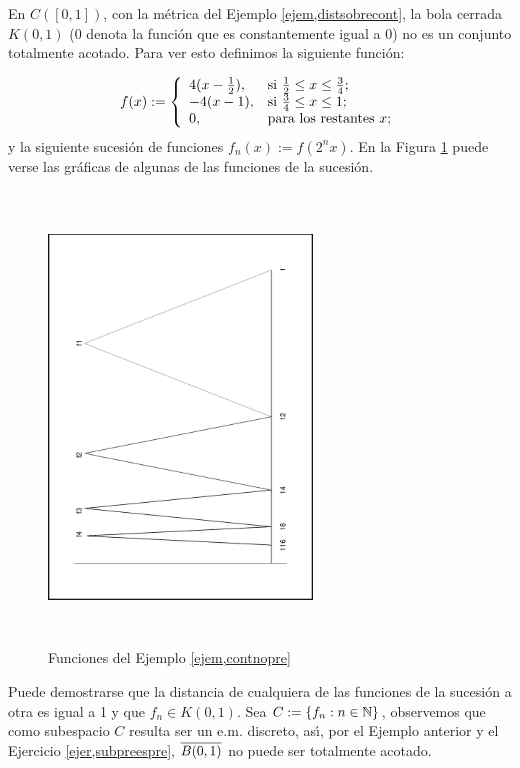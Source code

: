 \begin{ejemplo}\label{ejem,contnopre} En $C([0,1])$, con la m\'etrica
 del Ejemplo
\vref{ejem,distsobrecont}, la bola cerrada $K(0,1)$ (0 denota la
funci\'on que es constantemente igual a 0) no es un conjunto
totalmente acotado. Para ver esto definimos la siguiente
funci\'on:

\[
	f(x):=\left\{%
\begin{array}{ll}
	4(x-\frac12), & \hbox{si $\frac12\leq x\leq \frac34$;} \\
	-4(x-1), & \hbox{si $\frac34\leq x\leq 1$;} \\
	0, & \hbox{para los restantes $x$;} \\
\end{array}
\right.
\]
y la siguiente sucesi\'on de funciones $f_n(x):=f(2^nx)$. En la
Figura \ref{fig,contnopre} puede verse las gr\'aficas de algunas
de las funciones de la sucesi\'on.

\begin{figure}[h]
\begin{center}
	\includegraphics[height=12cm,
	width=7cm,angle=-90]{noprecom.eps}
	\caption{Funciones del Ejemplo
	\ref{ejem,contnopre}}\label{fig,contnopre}
\end{center}
\end{figure}

Puede demostrarse que la distancia de cualquiera de las funciones
de la sucesi\'on a otra es igual a 1 y que $f_n\in K(0,1)$. Sea
$C:=\{f_n:n\in\nn\}$, observemos que como subespacio $C$ resulta
ser un e.m. discreto, as\'{\i}, por el Ejemplo anterior y el
Ejercicio \vref{ejer,subpreespre}, $\C{B(0,1)}$ no puede ser
totalmente acotado.
\end{ejemplo}

